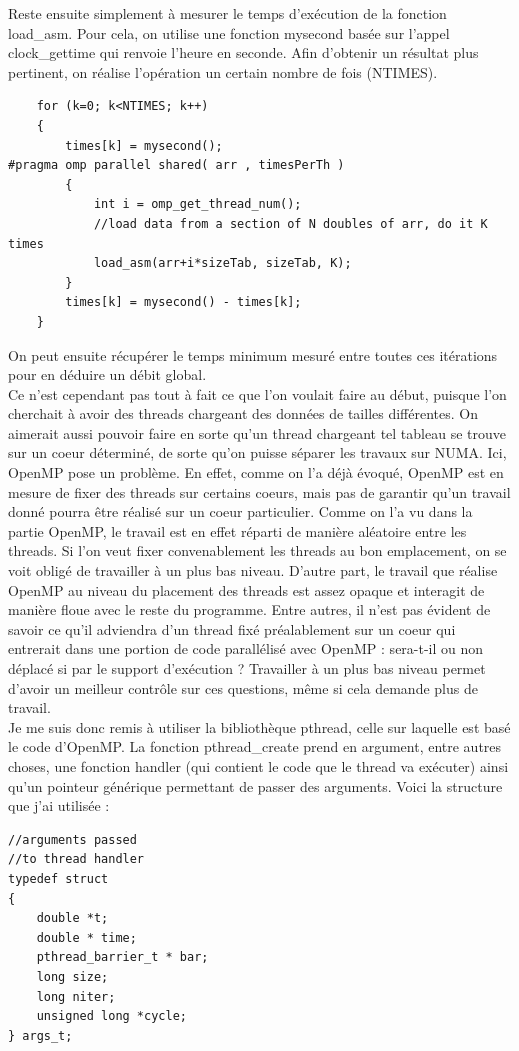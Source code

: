 \documentclass{report}
\begin{document}
Reste ensuite simplement à mesurer le temps d'exécution de la fonction load\_asm. Pour cela, on utilise
une fonction mysecond basée sur l'appel clock\_gettime qui renvoie l'heure en seconde. Afin d'obtenir
un résultat plus pertinent, on réalise l'opération un certain nombre de fois (NTIMES).
\begin{lstlisting}
	for (k=0; k<NTIMES; k++)
	{
		times[k] = mysecond();
#pragma omp parallel shared( arr , timesPerTh )
		{
			int i = omp_get_thread_num();
			//load data from a section of N doubles of arr, do it K times
			load_asm(arr+i*sizeTab, sizeTab, K);
		}
		times[k] = mysecond() - times[k];
	}
\end{lstlisting}
On peut ensuite récupérer le temps minimum mesuré entre toutes ces itérations pour en déduire un débit
global. 
\\Ce n'est cependant pas tout à fait ce que l'on voulait faire au début, puisque l'on cherchait à 
avoir des threads chargeant des données de tailles différentes. On aimerait aussi pouvoir faire en sorte
qu'un thread chargeant tel tableau se trouve sur un coeur déterminé, de sorte qu'on puisse séparer les
travaux sur NUMA. Ici, OpenMP pose un problème. En effet, comme on l'a déjà évoqué, OpenMP est en mesure
de fixer des threads sur certains coeurs, mais pas de garantir qu'un travail donné pourra être réalisé
sur un coeur particulier. Comme on l'a vu dans la partie OpenMP, le travail est en effet réparti de 
manière aléatoire entre les threads. Si l'on veut fixer convenablement les threads au bon emplacement,
on se voit obligé de travailler à un plus bas niveau. D'autre part, le travail que réalise OpenMP au 
niveau du placement des threads est assez opaque et interagit de manière floue avec le reste du programme. 
Entre autres, il n'est pas évident de savoir ce qu'il adviendra d'un thread fixé préalablement sur 
un coeur qui entrerait dans une portion de code parallélisé avec OpenMP : sera-t-il ou non déplacé si 
par le support d'exécution ? Travailler à un plus bas niveau permet d'avoir un meilleur
contrôle sur ces questions, même si cela demande plus de travail. 
\\Je me suis donc remis à utiliser la bibliothèque pthread, celle sur laquelle est basé le code 
d'OpenMP. La fonction pthread\_create prend en argument, entre autres choses, une fonction 
handler (qui contient le code que le thread va exécuter) ainsi qu'un pointeur générique permettant 
de passer des arguments. Voici la structure que j'ai utilisée : 
\begin{lstlisting}
//arguments passed
//to thread handler
typedef struct 
{
	double *t;
	double * time;
	pthread_barrier_t * bar;
	long size;
	long niter;
	unsigned long *cycle;
} args_t;
\end{lstlisting}
\end{document}
